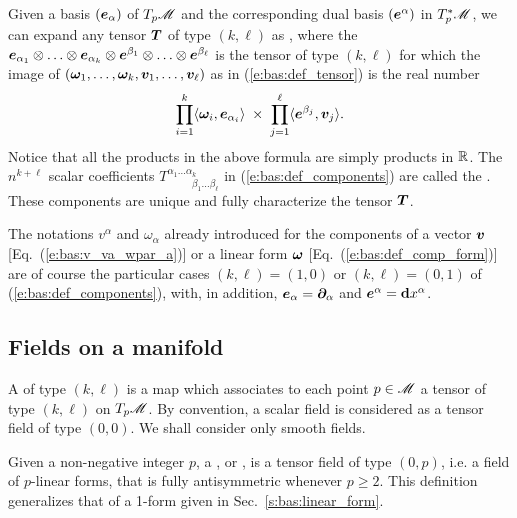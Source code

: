 Given a basis $(\bm{e}_\alpha)$ of $T_p\mathscr{M}$
and the corresponding dual basis $(\bm{e}^\alpha)$ in ${T_p^*\mathscr{M}}$, we
can expand any tensor $\bm{T}$ of type $(k,\ell)$ as
\be \label{e:bas:def_components}
     ,
\ee
where the  $ \bm{e}_{\alpha_1} \otimes \ldots \otimes \bm{e}_{\alpha_k} \otimes
\bm{e}^{\beta_1} \otimes \ldots \otimes \bm{e}^{\beta_\ell}$ is the tensor of
type $(k,\ell)$ for which the image of  $(\bm{\omega}_1,\ldots,\bm{\omega}_k,\bm{v}_1,\ldots,\bm{v}_\ell)$ as in
(\ref{e:bas:def_tensor}) is the real number
\[
    \prod_{i=1}^k \langle \bm{\omega}_i,\bm{e}_{\alpha_i}\rangle \;\times\;
    \prod_{j=1}^\ell \langle \bm{e}^{\beta_j},\bm{v}_j\rangle .
\]
Notice that all the products in the above formula are simply products in $\mathbb{R}$.
The $n^{k+\ell}$ scalar coefficients  $T^{\alpha_1\ldots\alpha_k}_{\qquad\ \; \beta_1\ldots\beta_\ell}$ in (\ref{e:bas:def_components}) are called the .
These components are unique and fully characterize
the tensor $\bm{T}$.

\begin{remark}
The notations $v^\alpha$ and $\omega_\alpha$ already introduced for the components
of a vector $\bm{v}$ [Eq.~(\ref{e:bas:v_va_wpar_a})]
or a linear form $\bm{\omega}$ [Eq.~(\ref{e:bas:def_comp_form})] are of course the
particular cases $(k,\ell)=(1,0)$ or $(k,\ell)=(0,1)$ of (\ref{e:bas:def_components}), with,
in addition, $\bm{e}_\alpha=\bm{\partial}_\alpha$ and $\bm{e}^\alpha = \mathbf{d} x^\alpha$.
\end{remark}


\subsection{Fields on a manifold} \label{s:bas:fields}

A  of type $(k,\ell)$ is a map
which associates to each point $p\in\mathscr{M}$ a tensor of type $(k,\ell)$ on $T_p\mathscr{M}$.
By convention, a scalar field is considered as a tensor field of type $(0,0)$.
We shall consider only smooth fields.

Given a non-negative integer $p$, a
,
or
, is a tensor field of type $(0,p)$, i.e.
a field of $p$-linear forms, that is fully antisymmetric whenever $p\geq 2$.
This definition generalizes that of a 1-form given in Sec.~\ref{s:bas:linear_form}.

